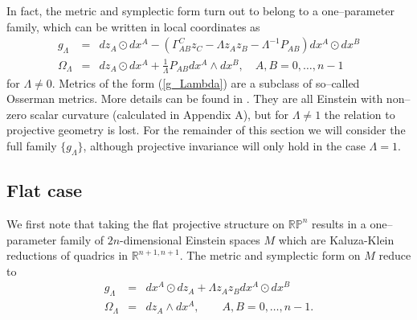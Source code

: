 In fact, the metric and symplectic form turn out to belong to a one--parameter family, which can be written in local coordinates as
\begin{eqnarray}
\label{g_Lambda}
g_\Lambda &=& dz_A\odot dx^A-(\Gamma^C_{AB}z_C-\Lambda z_Az_B-\Lambda^{-1}P_{AB})dx^A\odot dx^B \\
\Omega_\Lambda &=& dz_A\odot dx^A + \frac{1}{\Lambda}P_{AB}dx^A\wedge dx^B,\quad A,B=0,\dots,n-1 \nonumber
\end{eqnarray}
for $\Lambda\neq 0$. Metrics of the form (\ref{g_Lambda}) are a subclass of so--called Osserman metrics. More details can be found in \cite{osserman}. They are all Einstein with non--zero scalar curvature (calculated in  Appendix A), but for $\Lambda\neq 1$ the relation to projective geometry is lost. For the remainder of this section we will consider the full family $\{g_\Lambda\}$, although projective invariance will only hold in the case $\Lambda=1$.

\subsection{Flat case}

We first note that taking the flat projective structure on $\mathbb{RP}^{n}$
results in a one--parameter family of $2n$-dimensional Einstein spaces $M$ which are Kaluza-Klein
reductions of quadrics in $\mathbb{R}^{n+1,n+1}$. The metric and symplectic form on $M$ reduce to 
\begin{eqnarray*}
g_{\Lambda} & = & {d}x^{A}\odot {d}z_{A}+\Lambda z_{A}z_B{d}x^{A}\odot dx^B\\
\Omega_{\Lambda} & = & {d}z_{A}\wedge{d}x^{A},\qquad A,B=0,\dots,n-1.
\end{eqnarray*}

